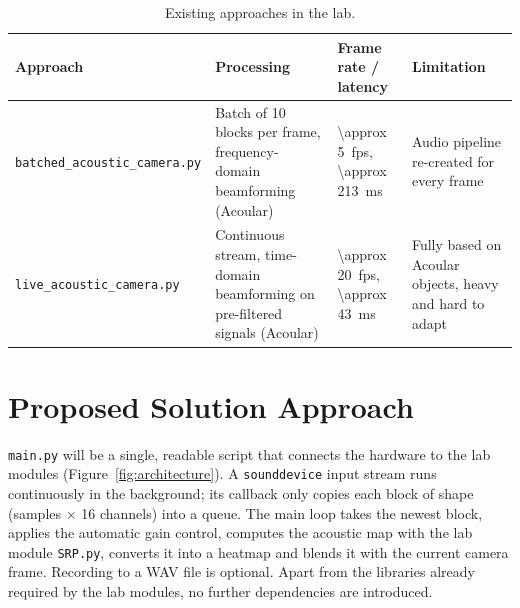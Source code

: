 \documentclass[11pt,a4paper]{article}
\newcommand{\code}[1]{\texttt{#1}}
\begin{document}
\begin{table}[H]
  \centering
  \caption{Existing approaches in the lab.}
  \label{tab:software}
  \small
  \begin{tabularx}{\textwidth}{@{}>{\raggedright}p{3.6cm}>{\raggedright}X>{\raggedright}p{2.6cm}>{\raggedright\arraybackslash}X@{}}
    \toprule
    \textbf{Approach} & \textbf{Processing} & \textbf{Frame rate / latency} & \textbf{Limitation} \\
    \midrule
    \code{batched\_acoustic\_\allowbreak camera.py} & Batch of 10 blocks per frame, frequency-domain beamforming (Acoular) & \SI{\approx 5}{fps}, \SI{\approx 213}{\milli\second} & Audio pipeline re-created for every frame \\
    \code{live\_acoustic\_\allowbreak camera.py} & Continuous stream, time-domain beamforming on pre-filtered signals (Acoular) & \SI{\approx 20}{fps}, \SI{\approx 43}{\milli\second} & Fully based on Acoular objects, heavy and hard to adapt \\
    \bottomrule
  \end{tabularx}
\end{table}

\section{Proposed Solution Approach}
\code{main.py} will be a single, readable script that connects the hardware to
the lab modules (Figure~\ref{fig:architecture}). A \code{sounddevice} input
stream runs continuously in the background; its callback only copies each
block of shape (samples $\times$ 16 channels) into a queue. The main loop takes
the newest block, applies the automatic gain control, computes the acoustic
map with the lab module \code{SRP.py}, converts it into a heatmap and blends it with the
current camera frame. Recording to a WAV file is optional. Apart from the
libraries already required by the lab modules, no further dependencies are
introduced.
\end{document}
